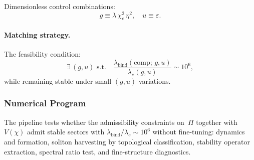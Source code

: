     Dimensionless control combinations:
    \begin{equation}
      g \equiv \lambda\,\chi_c^2\,\eta^2,
      \quad
      u \equiv \varepsilon.
      \label{eq:dimensionless_controls}
    \end{equation}

    \paragraph{Matching strategy.}
      \label{matching-strategy-using-the-proton-to-electron-ratio}
      The feasibility condition:
    \begin{equation}
      \exists\,(g,u)
      \text{ s.t.}\quad
      \frac{\lambda_{\mathrm{bind}}(\mathrm{comp};\,g,u)}
      {\lambda_e(g,u)}
      \sim 10^6,
      \label{eq:feasibility_condition_lambda_eta}
      \end{equation}
      while remaining stable under small $(g,u)$ variations.

  \subsubsection*{Numerical Program}
    \label{subsec:numerical_program_mass_ratio}

    The pipeline tests whether the admissibility constraints on~$\Pi$
    together with $V(\chi)$ admit stable sectors with
    $\lambda_{\mathrm{bind}}/\lambda_e \sim 10^6$ without fine-tuning:
    dynamics and formation, soliton harvesting by topological
    classification, stability operator extraction, spectral ratio test,
    and fine-structure diagnostics.
